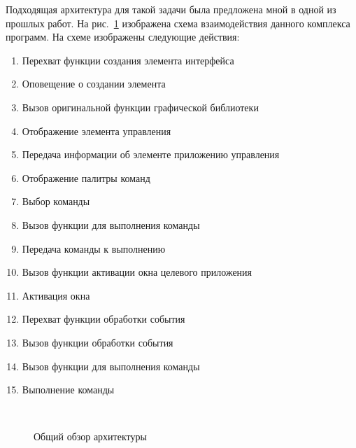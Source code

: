 Подходящая архитектура для такой задачи была предложена мной в одной из прошлых
работ\cite{polshakovinject}. На рис.~\ref{fig:arch} изображена схема
взаимодействия данного комплекса программ. На схеме изображены следующие
действия:
\begin{enumerate}
    \item Перехват функции создания элемента интерфейса
    \item Оповещение о создании элемента
    \item Вызов оригинальной функции графической библиотеки
    \item Отображение элемента управления
    \item Передача информации об элементе приложению управления
    \item Отображение палитры команд
    \item Выбор команды
    \item Вызов функции для выполнения команды
    \item Передача команды к выполнению
    \item Вызов функции активации окна целевого приложения
    \item Активация окна
    \item Перехват функции обработки события
    \item Вызов функции обработки события
    \item Вызов функции для выполнения команды
    \item Выполнение команды
\end{enumerate}

\begin{figure}
	\centering
	 \\
	\caption{Общий обзор архитектуры}\label{fig:arch}
\end{figure}
